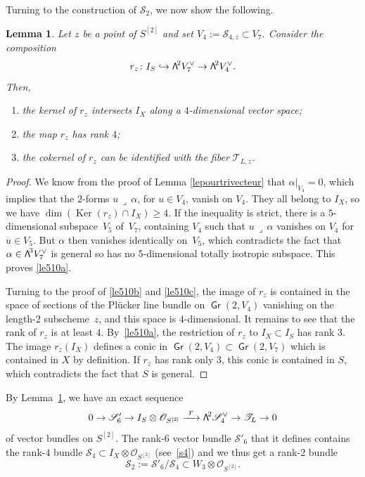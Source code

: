\documentclass[11pt]{article}
\let\mathcal\mathscr
\newenvironment{enumeratea}
{\bgroup\def\theenumi{\alph{enumi}}\def\theenumii{\arabic{enumii}}\begin{enumerate}}
{\end{enumerate}\egroup}
\newcommand\hto{\mathrel{\lhook\joinrel\to}}
\newcommand\To[1]{\mathchoice{\xrightarrow{\textstyle\kern4pt#1\kern3pt}}{\stackrel{#1}{\longrightarrow}}{}{}}
\newtheorem{lemm}{Lemma}[section]
\theoremstyle{definition}
\newcommand\cO{\mathcal{O}}\let\OO\cO
\newcommand\cS{\mathcal{S}}\let\soustauto\cS
\newcommand\cT{\mathcal{T}}
\DeclareMathOperator{\Gr}{\mathsf{Gr}}
\let\dual\vee
\DeclareMathOperator{\Ker}{Ker}
\newcommand\bw[1]{{\hbox{\large$\mathsf{\Lambda}$}^{\!#1}}}
\newcommand\hilbS{S^{[2]}}
\begin{document}
Turning to the construction of
$\cS_2$, we now show the following.

\begin{lemm} \label{le510}
Let $z$ be a point of $\hilbS$ and set
$V_4:=\cS_{4,z}\subset V_7$. Consider the composition
\[
r_z\colon I_S\hto \bw2V_7^\dual\to \bw2V_4^\dual.
\]
Then,
\begin{enumeratea}
\item\label{le510a}
the kernel of $r_z$ intersects $I_X$ along a $4$-dimensional vector
space;
\item\label{le510b}
the map
$r_z$ has rank $4$;
\item\label{le510c}
the cokernel of
$r_z$ can be identified with the fiber $\cT_{L,z}$.
\end{enumeratea}
\end{lemm}

\begin{proof} We know from the proof of Lemma \ref{lepourtrivecteur}
that $\alpha\vert_{V_4}=0$, which implies that the $2$-forms
$u\,\lrcorner\,\alpha$, for $u\in V_4$, vanish on $V_4$. They all belong to $I_X$, so we have
$\dim (\Ker (r_z)\cap I_X)\geq 4$. If the inequality is strict, there is a $5$-dimensional subspace~$V_5$ of~$V_7$, containing $V_4$ such that $u\,\lrcorner\,\alpha$ vanishes on $V_4$ for $u\in V_5$. But
$\alpha$ then vanishes identically on~$V_5$, which contradicts the fact that $\alpha\in \bw3 V_7^\dual$ is general so has no
$5$-dimensional totally isotropic subspace. This proves \eqref{le510a}.

Turning to the proof of \eqref{le510b} and \eqref{le510c}, the image of $r_z$ is contained in the space of sections of the Plücker line bundle on $\Gr(2,V_4)$ vanishing on the length-$2$ subscheme~$z$, and this space is $4$-dimensional. It remains to see that the rank of $r_z$ is at least $4$.
By~\eqref{le510a}, the restriction of $r_z$ to $I_X\subset I_S$ has rank $3$. The image $r_z(I_X)$ defines a conic in
$\Gr(2,V_4 )\subset \Gr(2,V_7 )$ which is contained in $X$ by definition.
If $r_z$ has rank only $3$,
this conic is contained in $S$, which contradicts the fact that $S$ is general.
\end{proof}

By Lemma~\ref{le510}, we have an exact sequence
\begin{equation}\label{eq20}
0\to \cS'_6\to I_S\otimes \cO_{\hilbS}\To{r} \bw2\cS_4^\vee
\to \cT_{L}\to 0
\end{equation}
of vector bundles on $\hilbS$. The rank-$6$ vector bundle $\cS'_6$ that it defines
contains the rank-$4$ bundle
$\cS_4\subset I_X\otimes \cO_{\hilbS}$ (see~\eqref{s4}) and we thus get a rank-$2$
bundle
\[
\cS_2:=\cS'_6/\cS_4\subset W_3\otimes \cO_{\hilbS}.
\]
\end{document}
